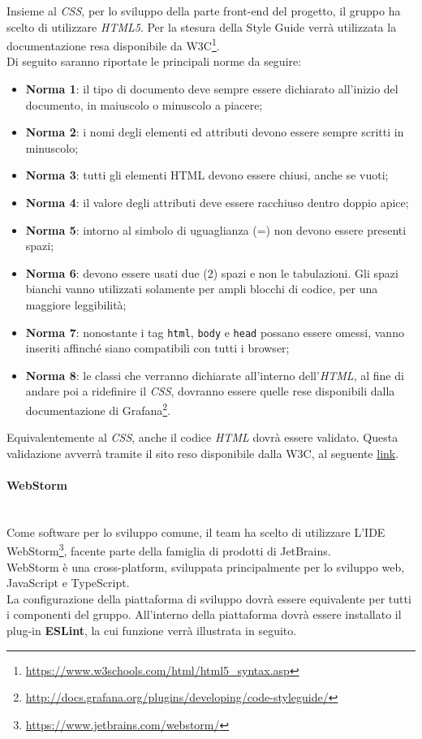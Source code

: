 Insieme al \textit{CSS}, per lo sviluppo della parte front-end del progetto, il gruppo ha scelto di utilizzare \textit{HTML5}. Per la stesura della Style Guide verrà utilizzata la documentazione resa disponibile da W3C\footnote{\url{https://www.w3schools.com/html/html5_syntax.asp}}.\\
Di seguito saranno riportate le principali norme da seguire: 
\begin{itemize}
	\item \textbf{Norma 1}: 
		il tipo di documento deve sempre essere dichiarato all'inizio del documento, in maiuscolo o minuscolo a piacere;
	\item \textbf{Norma 2}: 
		i nomi degli elementi ed attributi devono essere sempre scritti in minuscolo;
	\item \textbf{Norma 3}:
		tutti gli elementi HTML devono essere chiusi, anche se vuoti;
	\item \textbf{Norma 4}:
		il valore degli attributi deve essere racchiuso dentro doppio apice;
	\item \textbf{Norma 5}: 
		intorno al simbolo di uguaglianza (=) non devono essere presenti spazi;
	\item \textbf{Norma 6}:
		devono essere usati due (2) spazi e non le tabulazioni. Gli spazi bianchi vanno utilizzati solamente per ampli blocchi di codice, per una maggiore leggibilità;
	\item \textbf{Norma 7}:
		nonostante i tag \texttt{html}, 	\texttt{body} e \texttt{head} possano essere omessi, vanno inseriti affinché siano compatibili con tutti i browser;
	\item \textbf{Norma 8}:
		le classi che verranno dichiarate all'interno dell'\textit{HTML}, al fine di andare poi a ridefinire il \textit{CSS}, dovranno essere quelle rese disponibili dalla documentazione di Grafana\footnote{\url{http://docs.grafana.org/plugins/developing/code-styleguide/}}.
\end{itemize}

Equivalentemente al \textit{CSS}, anche il codice \textit{HTML} dovrà essere validato. Questa validazione avverrà tramite il sito reso disponibile dalla W3C, al seguente \href{https://validator.w3.org/}{link}.


\paragraph{WebStorm}\-\\
Come software per lo sviluppo comune, il team ha scelto di utilizzare L'IDE WebStorm\footnote{\url{https://www.jetbrains.com/webstorm/}}, facente parte della famiglia di prodotti di JetBrains. \\
WebStorm è una cross-platform, sviluppata principalmente per lo sviluppo web, JavaScript e TypeScript. \\
La configurazione della piattaforma di sviluppo dovrà essere equivalente per tutti i componenti del gruppo. All'interno della piattaforma dovrà essere installato il plug-in \textbf{ESLint}, la cui funzione verrà illustrata in seguito.

